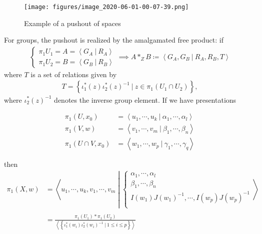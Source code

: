 \begin{theorem}
\begin{figure}
\centering
\texttt{[image: figures/image\_2020-06-01-00-07-39.png]}
\caption{Example of a pushout of spaces}
\end{figure}

For groups, the pushout is realized by the amalgamated free product: if
\begin{align*}
\begin{cases}
\pi_1 U_1 = A = \left\langle{G_{A} {~\mathrel{\Big|}~}R_{A}}\right\rangle \\
\pi_1 U_2 = B = \left\langle{G_{B} {~\mathrel{\Big|}~}R_{B}}\right\rangle
\end{cases}
\implies 
A \ast_{Z} B \coloneqq\left\langle{ G_{A}, G_{B} {~\mathrel{\Big|}~}R_{A}, R_{B}, T}\right\rangle
\end{align*}
where \(T\) is a set of relations given by
\begin{align*}
T = \left\{{\iota_{1}^*(z) \iota_{2}^*  (z) ^{-1}   {~\mathrel{\Big|}~}z\in \pi_1 (U_1 \cap U_2)}\right\}
,\end{align*}
where \(\iota_2^*(z) ^{-1}\) denotes the inverse group element. If we
have presentations

\begin{align*} 
\pi_{1}(U, x_0) &=
\left\langle u_{1}, \cdots, u_{k} {~\mathrel{\Big|}~}\alpha_{1}, \cdots, \alpha_{l}\right\rangle \\ 
\pi_{1}(V, w) &=\left\langle v_{1}, \cdots, v_{m} {~\mathrel{\Big|}~}\beta_{1}, \cdots, \beta_{n}\right\rangle \\ 
\pi_{1}(U \cap V, x_0) 
&=\left\langle w_{1}, \cdots, w_{p} {~\mathrel{\Big|}~}\gamma_{1}, \cdots, \gamma_{q}\right\rangle 
\end{align*}

then
\begin{align*}
\pi_{1}(X, w) 
&= \left\langle 
u_{1}, \cdots, u_{k}, v_{1}, \cdots, v_{m} 
\middle\vert
\begin{cases}
\alpha_{1}, 
\cdots, 
\alpha_{l}
\\
\beta_{1}, 
\cdots, 
\beta_{n}
\\
  I\left(w_{1}\right) J\left(w_{1}\right)^{-1}, 
  \cdots, 
  I\left(w_{p}\right) J\left(w_{p}\right)^{-1}
\\ 
\end{cases}
\right\rangle \\ \\
&= 
\frac{
  \pi_{1}(U_1) \ast \pi_{1}(U_2)
} {
  \left\langle{
    \left\{{\iota_1^*(w_{i}) \iota_2^*(w_{i})^{-1}{~\mathrel{\Big|}~}1\leq i \leq p}\right\}
  }\right\rangle
}
\end{align*}

\end{theorem}


